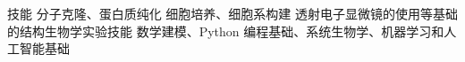 \begin{rubric}{技能}
\entry*[] 分子克隆、蛋白质纯化
\entry*[] 细胞培养、细胞系构建
\entry*[] 透射电子显微镜的使用等基础的结构生物学实验技能
\entry*[] 数学建模、Python 编程基础、系统生物学、机器学习和人工智能基础
\end{rubric}
